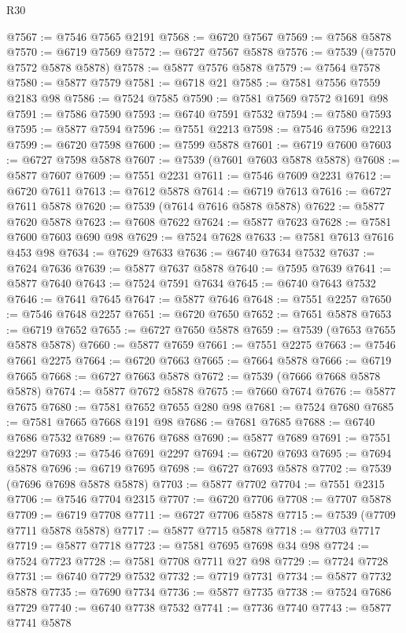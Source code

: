 \begin{lexlean}{R30}
\begin{coremodule}
@7567 := @7546 @7565 @2191
@7568 := @6720 @7567
@7569 := @7568 @5878
@7570 := @6719 @7569
@7572 := @6727 @7567 @5878
@7576 := @7539 (@7570 @7572 @5878 @5878)
@7578 := @5877 @7576 @5878
@7579 := @7564 @7578
@7580 := @5877 @7579
@7581 := @6718 @21
@7585 := @7581 @7556 @7559 @2183 @98
@7586 := @7524 @7585
@7590 := @7581 @7569 @7572 @1691 @98
@7591 := @7586 @7590
@7593 := @6740 @7591 @7532
@7594 := @7580 @7593
@7595 := @5877 @7594
@7596 := @7551 @2213
@7598 := @7546 @7596 @2213
@7599 := @6720 @7598
@7600 := @7599 @5878
@7601 := @6719 @7600
@7603 := @6727 @7598 @5878
@7607 := @7539 (@7601 @7603 @5878 @5878)
@7608 := @5877 @7607
@7609 := @7551 @2231
@7611 := @7546 @7609 @2231
@7612 := @6720 @7611
@7613 := @7612 @5878
@7614 := @6719 @7613
@7616 := @6727 @7611 @5878
@7620 := @7539 (@7614 @7616 @5878 @5878)
@7622 := @5877 @7620 @5878
@7623 := @7608 @7622
@7624 := @5877 @7623
@7628 := @7581 @7600 @7603 @690 @98
@7629 := @7524 @7628
@7633 := @7581 @7613 @7616 @453 @98
@7634 := @7629 @7633
@7636 := @6740 @7634 @7532
@7637 := @7624 @7636
@7639 := @5877 @7637 @5878
@7640 := @7595 @7639
@7641 := @5877 @7640
@7643 := @7524 @7591 @7634
@7645 := @6740 @7643 @7532
@7646 := @7641 @7645
@7647 := @5877 @7646
@7648 := @7551 @2257
@7650 := @7546 @7648 @2257
@7651 := @6720 @7650
@7652 := @7651 @5878
@7653 := @6719 @7652
@7655 := @6727 @7650 @5878
@7659 := @7539 (@7653 @7655 @5878 @5878)
@7660 := @5877 @7659
@7661 := @7551 @2275
@7663 := @7546 @7661 @2275
@7664 := @6720 @7663
@7665 := @7664 @5878
@7666 := @6719 @7665
@7668 := @6727 @7663 @5878
@7672 := @7539 (@7666 @7668 @5878 @5878)
@7674 := @5877 @7672 @5878
@7675 := @7660 @7674
@7676 := @5877 @7675
@7680 := @7581 @7652 @7655 @280 @98
@7681 := @7524 @7680
@7685 := @7581 @7665 @7668 @191 @98
@7686 := @7681 @7685
@7688 := @6740 @7686 @7532
@7689 := @7676 @7688
@7690 := @5877 @7689
@7691 := @7551 @2297
@7693 := @7546 @7691 @2297
@7694 := @6720 @7693
@7695 := @7694 @5878
@7696 := @6719 @7695
@7698 := @6727 @7693 @5878
@7702 := @7539 (@7696 @7698 @5878 @5878)
@7703 := @5877 @7702
@7704 := @7551 @2315
@7706 := @7546 @7704 @2315
@7707 := @6720 @7706
@7708 := @7707 @5878
@7709 := @6719 @7708
@7711 := @6727 @7706 @5878
@7715 := @7539 (@7709 @7711 @5878 @5878)
@7717 := @5877 @7715 @5878
@7718 := @7703 @7717
@7719 := @5877 @7718
@7723 := @7581 @7695 @7698 @34 @98
@7724 := @7524 @7723
@7728 := @7581 @7708 @7711 @27 @98
@7729 := @7724 @7728
@7731 := @6740 @7729 @7532
@7732 := @7719 @7731
@7734 := @5877 @7732 @5878
@7735 := @7690 @7734
@7736 := @5877 @7735
@7738 := @7524 @7686 @7729
@7740 := @6740 @7738 @7532
@7741 := @7736 @7740
@7743 := @5877 @7741 @5878

\end{coremodule}
\end{lexlean}
